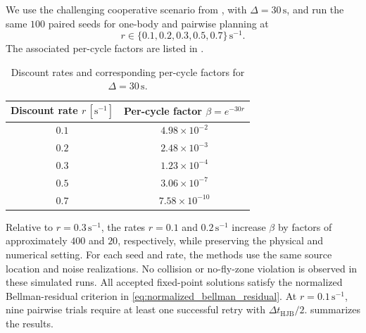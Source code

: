 \documentclass{article}
\begin{document}
We use the challenging cooperative scenario from , with $\Delta=30\,\mathrm{s}$, and run the same $100$ paired seeds for one-body and pairwise planning at
\begin{equation}
r\in\{0.1,0.2,0.3,0.5,0.7\}\,\mathrm{s^{-1}}.
\end{equation}
The associated per-cycle factors are listed in .
\begin{table}[h]
  \centering
  \caption{Discount rates and corresponding per-cycle factors for $\Delta=30\,\mathrm{s}$.}
  \label{tab:discount_factors}
  \begin{tabular}{cc}
    \toprule
    Discount rate $r\,[\mathrm{s^{-1}}]$ & Per-cycle factor $\beta=e^{-30r}$ \\
    \midrule
    $0.1$ & $4.98\times10^{-2}$ \\
    $0.2$ & $2.48\times10^{-3}$ \\
    $0.3$ & $1.23\times10^{-4}$ \\
    $0.5$ & $3.06\times10^{-7}$ \\
    $0.7$ & $7.58\times10^{-10}$ \\
    \bottomrule
  \end{tabular}
\end{table}

Relative to $r=0.3\,\mathrm{s^{-1}}$, the rates $r=0.1$ and $0.2\,\mathrm{s^{-1}}$ increase $\beta$ by factors of approximately $400$ and $20$, respectively, while preserving the physical and numerical setting.
For each seed and rate, the methods use the same source location and noise realizations.
No collision or no-fly-zone violation is observed in these simulated runs.
All accepted fixed-point solutions satisfy the normalized Bellman-residual criterion in \eqref{eq:normalized_bellman_residual}.
At $r=0.1\,\mathrm{s^{-1}}$, nine pairwise trials require at least one successful retry with $\Delta t_{\mathrm{HJB}}/2$.
 summarizes the results.
\end{document}

